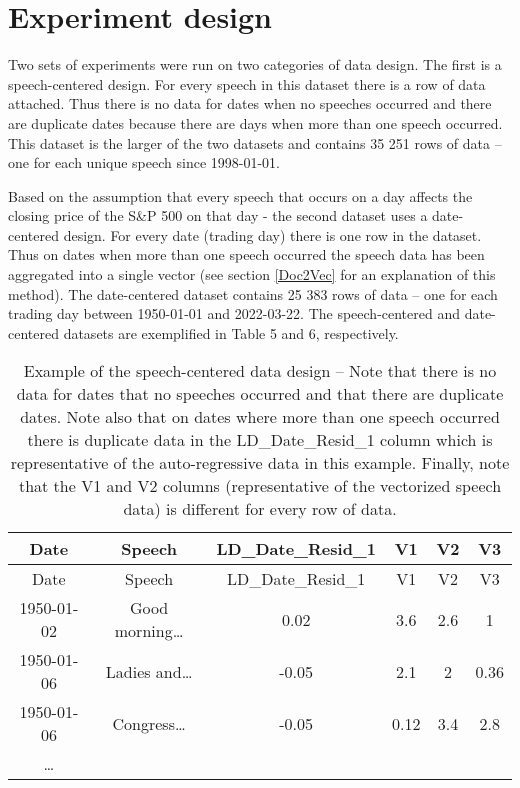 \documentclass[11pt,preprint, authoryear]{elsarticle}
\numberwithin{equation}{section}
\numberwithin{figure}{section}
\numberwithin{table}{section}
\begin{document}
\hypertarget{experiment-design}{%
\section{Experiment design}\label{experiment-design}}

Two sets of experiments were run on two categories of data design. The
first is a speech-centered design. For every speech in this dataset
there is a row of data attached. Thus there is no data for dates when no
speeches occurred and there are duplicate dates because there are days
when more than one speech occurred. This dataset is the larger of the
two datasets and contains 35 251 rows of data -- one for each unique
speech since 1998-01-01.

Based on the assumption that every speech that occurs on a day affects
the closing price of the S\&P 500 on that day - the second dataset uses
a date-centered design. For every date (trading day) there is one row in
the dataset. Thus on dates when more than one speech occurred the speech
data has been aggregated into a single vector (see section \ref{Doc2Vec}
for an explanation of this method). The date-centered dataset contains
25 383 rows of data -- one for each trading day between 1950-01-01 and
2022-03-22. The speech-centered and date-centered datasets are
exemplified in Table 5 and 6, respectively.

\begin{longtable}[]{@{}cccccc@{}}
\caption{Example of the speech-centered data design -- Note that there
is no data for dates that no speeches occurred and that there are
duplicate dates. Note also that on dates where more than one speech
occurred there is duplicate data in the LD\_Date\_Resid\_1 column which
is representative of the auto-regressive data in this example. Finally,
note that the V1 and V2 columns (representative of the vectorized speech
data) is different for every row of data.}\tabularnewline
\toprule
Date & Speech & LD\_Date\_Resid\_1 & V1 & V2 & V3 \\
\midrule
\endfirsthead
\toprule
Date & Speech & LD\_Date\_Resid\_1 & V1 & V2 & V3 \\
\midrule
\endhead
1950-01-02 & Good morning\ldots{} & 0.02 & 3.6 & 2.6 & 1 \\
1950-01-06 & Ladies and\ldots{} & -0.05 & 2.1 & 2 & 0.36 \\
1950-01-06 & Congress\ldots{} & -0.05 & 0.12 & 3.4 & 2.8 \\
\ldots{} & & & & & \\
\bottomrule
\end{longtable}
\end{document}
